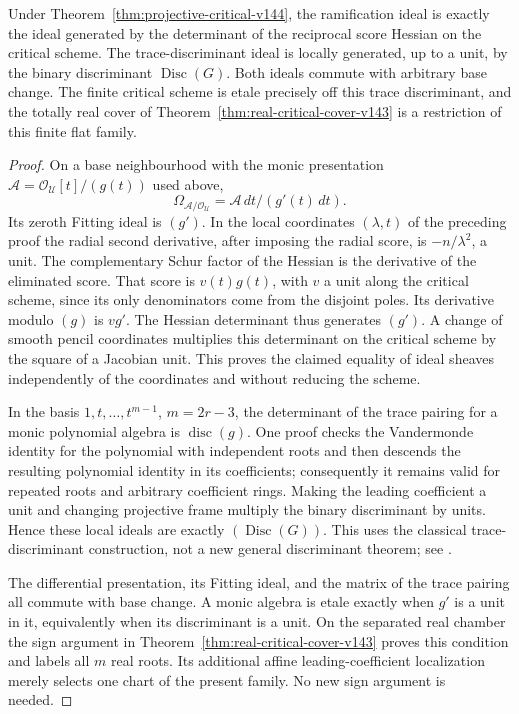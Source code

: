 \begin{theorem}
\label{thm:critical-ramification-v144}
Under Theorem~\ref{thm:projective-critical-v144}, the ramification
ideal is exactly the ideal generated by the determinant of the
reciprocal score Hessian on the critical scheme.  The trace-discriminant
ideal is locally generated, up to a unit, by the binary discriminant
\(\operatorname{Disc}(G)\).  Both ideals commute with arbitrary base
change.  The finite critical scheme is etale precisely off this
trace discriminant, and the totally real cover of
Theorem~\ref{thm:real-critical-cover-v143} is a restriction of this
finite flat family.
\end{theorem}
\begin{proof}
On a base neighbourhood with the monic presentation
\(\mathcal A=\mathcal O_{\mathscr U}[t]/(g(t))\) used above,
\[
       \Omega_{\mathcal A/\mathcal O_{\mathscr U}}
             =\mathcal A\,dt/(g'(t)\,dt).
\]
Its zeroth Fitting ideal is \((g')\).  In the local coordinates
\((\lambda,t)\) of the preceding proof the radial second derivative,
after imposing the radial score, is \(-n/\lambda^2\), a unit.
The complementary Schur factor of the Hessian is the derivative
of the eliminated score.  That score is \(v(t)g(t)\), with
\(v\) a unit along the critical scheme, since its only denominators
come from the disjoint poles.  Its derivative modulo \((g)\) is
\(v g'\).  The Hessian determinant thus generates \((g')\).
A change of smooth pencil coordinates multiplies this determinant
on the critical scheme by the square of a Jacobian unit.  This
proves the claimed equality of ideal sheaves independently of the
coordinates and without reducing the scheme.

In the basis \(1,t,\ldots,t^{m-1}\), \(m=2r-3\), the
determinant of the trace pairing for a monic polynomial algebra
is \(\operatorname{disc}(g)\).  One proof checks the Vandermonde
identity for the polynomial with independent roots and then descends
the resulting polynomial identity in its coefficients; consequently
it remains valid for repeated roots and arbitrary coefficient rings.
Making the leading coefficient a unit and changing projective frame
multiply the binary discriminant by units.  Hence these local ideals
are exactly \((\operatorname{Disc}(G))\).  This uses the classical
trace-discriminant construction, not a new general discriminant
theorem; see \cite[Tags~0BVH, 0BJF]{StacksCritical144}.

The differential presentation, its Fitting ideal, and the matrix of
the trace pairing all commute with base change.  A monic algebra is
etale exactly when \(g'\) is a unit in it, equivalently when its
discriminant is a unit.  On the separated real chamber the sign
argument in Theorem~\ref{thm:real-critical-cover-v143} proves this
condition and labels all \(m\) real roots.  Its additional affine
leading-coefficient localization merely selects one chart of the
present family.  No new sign argument is needed.
\end{proof}

